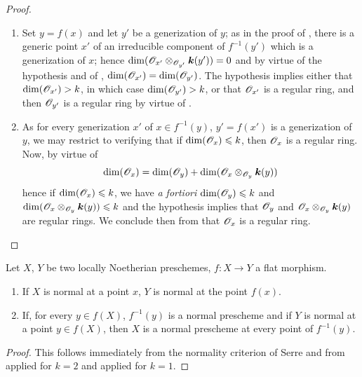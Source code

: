 \begin{proof}
\medskip\noindent
\begin{enumerate}[label=(\roman*)]
  \item Set $y=f(x)$ and let $y'$ be a generization of $y$; as in the proof of , there is a generic point $x'$ of an irreducible component of $f^{-1}(y')$ which is a generization of $x$; hence $\dim(\mathscr{O}_{x'}\otimes_{\mathscr{O}_{y'}}\boldsymbol{k}(y'))=0$ and by virtue of the hypothesis and of , $\dim(\mathscr{O}_{x'})=\dim(\mathscr{O}_{y'})$.
The hypothesis implies either that $\dim(\mathscr{O}_{x'})>k$, in which case $\dim(\mathscr{O}_{y'})>k$, or that $\mathscr{O}_{x'}$ is a regular ring, and then $\mathscr{O}_{y'}$ is a regular ring by virtue of .

  \item As for every generization $x'$ of $x\in f^{-1}(y)$, $y'=f(x')$ is a generization of $y$, we may restrict to verifying that if $\dim(\mathscr{O}_x)\leqslant k$, then $\mathscr{O}_x$ is a regular ring.
Now, by virtue of 
\[
  \dim(\mathscr{O}_x)=\dim(\mathscr{O}_y)+\dim(\mathscr{O}_x\otimes_{\mathscr{O}_y}\boldsymbol{k}(y))
\]
hence if $\dim(\mathscr{O}_x)\leqslant k$, we have \emph{a fortiori} $\dim(\mathscr{O}_y)\leqslant k$ and $\dim(\mathscr{O}_x\otimes_{\mathscr{O}_y}\boldsymbol{k}(y))\leqslant k$ and the hypothesis implies that $\mathscr{O}_y$ and $\mathscr{O}_x\otimes_{\mathscr{O}_y}\boldsymbol{k}(y)$ are regular rings.
We conclude then from  that $\mathscr{O}_x$ is a regular ring.
\end{enumerate}
\end{proof}

\begin{corollary}[6.5.4]
\label{IV.6.5.4}
Let $X$, $Y$ be two locally Noetherian preschemes, $f:X\to Y$ a flat morphism.
\begin{enumerate}[label=\upshape(\roman*)]
  \item If $X$ is normal at a point $x$, $Y$ is normal at the point $f(x)$.
  \item If, for every $y\in f(X)$, $f^{-1}(y)$ is a normal prescheme and if $Y$ is normal at a point $y\in f(X)$, then $X$ is a normal prescheme at every point of $f^{-1}(y)$.
\end{enumerate}
\end{corollary}

\begin{proof}
This follows immediately from the normality criterion of Serre  and from  applied for $k=2$ and  applied for $k=1$.
\end{proof}

